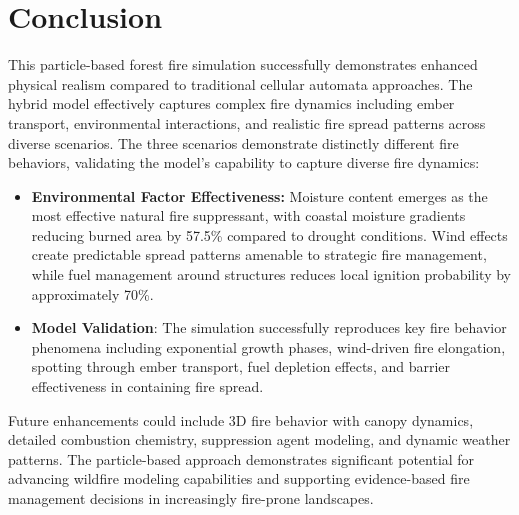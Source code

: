 \section{Conclusion}
This particle-based forest fire simulation successfully demonstrates enhanced physical realism compared to traditional cellular automata approaches. The hybrid model effectively captures complex fire dynamics including ember transport, environmental interactions, and realistic fire spread patterns across diverse scenarios.\newline
\newline
The three scenarios demonstrate distinctly different fire behaviors, validating the model's capability to capture diverse fire dynamics:
\begin{itemize}
	\item \textbf{Environmental Factor Effectiveness:} Moisture content emerges as the most effective natural fire suppressant, with coastal moisture gradients reducing burned area by 57.5\% compared to drought conditions. Wind effects create predictable spread patterns amenable to strategic fire management, while fuel management around structures reduces local ignition probability by approximately 70\%.
	\item \textbf{Model Validation}: The simulation successfully reproduces key fire behavior phenomena including exponential growth phases, wind-driven fire elongation, spotting through ember transport, fuel depletion effects, and barrier effectiveness in containing fire spread.
\end{itemize}
Future enhancements could include 3D fire behavior with canopy dynamics, detailed combustion chemistry, suppression agent modeling, and dynamic weather patterns. The particle-based approach demonstrates significant potential for advancing wildfire modeling capabilities and supporting evidence-based fire management decisions in increasingly fire-prone landscapes.
